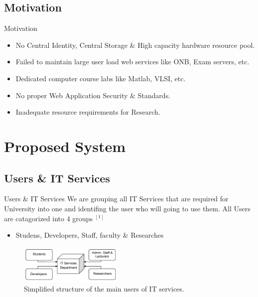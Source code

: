 \documentclass[xcolor=dvipsnames]{beamer}
\begin{document}
\subsection{Motivation}
\begin{frame}{Motivation}

\begin{itemize}
	\item No Central Identity, Central Storage \& High capacity hardware resource pool.
	\item Failed to maintain large user load web services like ONB, Exam servers, etc.
	\item Dedicated computer course labs like Matlab, VLSI, etc.
	\item No proper Web Application Security \& Standards.
	\item Inadequate resource requirements for Research.
\end{itemize}

\end{frame}



\section{Proposed System}
\subsection{Users \& IT Services}
\begin{frame}{Users \& IT Services}
We are grouping all IT Services that are required for University into one and identifing the user who will going to use them. All Users are catagorized into 4 groups $ ^{[1]}$
	
	\begin{itemize}
	\item Studens, Developers, Staff, faculty \& Researches
	\end{itemize}
\begin{figure}[H]
\begin{center}
\includegraphics[width=5cm]{./it.png}
\caption{ Simplified structure of the main users of IT services. \label{fig:Simplified structure of the main users of IT services. }}
\end{center}
\end{figure}
	
\end{frame}
\end{document}
